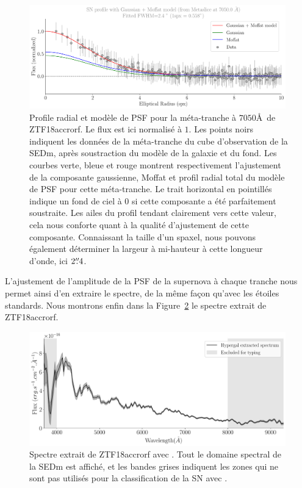 \documentclass[../main/main.tex]{subfiles}
\begin{document}
\begin{figure}
  \centering
  \includegraphics[width=0.99\textwidth]{../figures/07_scene/output_sn_profile_ZTF18accrorf.pdf}
  \caption[Profile radial et modèle de PSF pour une méta-tranche de
  ZTF18accrorf.]{Profile radial et modèle de PSF pour la méta-tranche à
    $7050$\AA\ de ZTF18accrorf. Le flux est ici normalisé à $1$. Les
    points noirs indiquent les données de la méta-tranche du cube
    d'observation de la SEDm, après soustraction du modèle de la galaxie
  et du fond. Les courbes verte, bleue et rouge montrent respectivement
  l'ajustement de la composante gaussienne, Moffat et profil radial
  total du modèle de PSF pour cette méta-tranche. Le trait horizontal en
pointillés indique un fond de ciel à $0$ si cette composante a été
parfaitement soustraite. Les ailes du profil tendant clairement vers
cette valeur, cela nous conforte quant à la qualité d'ajustement de
cette composante. Connaissant la taille d'un spaxel, nous pouvons
également déterminer la largeur à mi-hauteur à cette longueur d'onde, ici
$2\overset{\prime\prime}{.}4$.}
  \label{fig:radialprofileZTF18accrorf}
\end{figure}

L'ajustement de l'amplitude de la PSF de la supernova à chaque tranche
nous permet ainsi d'en extraire le spectre, de la même façon qu'avec les
étoiles standards. Nous montrons enfin dans la
Figure~\ref{fig:spectraZTF18accrorf} le spectre extrait de ZTF18accrorf.

\begin{figure}
  \centering
  \includegraphics[width=0.99\textwidth]{../figures/07_scene/output_sn_spectra_ZTF18accrorf.pdf}
  \caption[Spectre extrait de ZTF18accrorf avec \hypergal.]{Spectre
    extrait de ZTF18accrorf avec \hypergal. Tout le domaine spectral de
    la SEDm est affiché, et les bandes grises indiquent les zones
    qui ne sont pas utilisés pour la classification de la SN avec .}
  \label{fig:spectraZTF18accrorf}
\end{figure}
\end{document}
